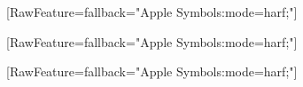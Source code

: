 \usepackage{fontspec} %
\usepackage{newunicodechar} %

\setmainfont{Warnock Pro}[RawFeature={fallback="Apple Symbols:mode=harf;"}]

\setsansfont{Futura}[RawFeature={fallback="Apple Symbols:mode=harf;"}]

\setmonofont{Source Code Pro}[RawFeature={fallback="Apple Symbols:mode=harf;"}]
